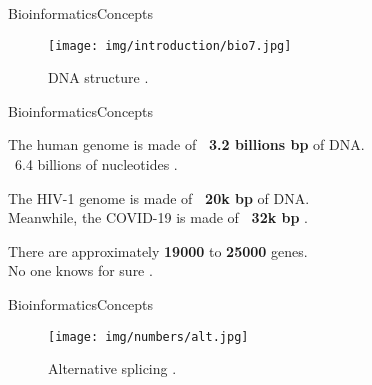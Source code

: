 \documentclass[10pt]{beamer}
\newcommand{\1}{
        	\setbeamertemplate{background}{
        		\texttt{[image: img/1]}
        		\tikz[overlay] \fill[fill opacity=0.75,fill=white] (0,0) rectangle (-\paperwidth,\paperheight);
        	}
}
\begin{document}
\begin{frame}{Bioinformatics}{Concepts}
	\begin{figure}[]
		\centering
		\texttt{[image: img/introduction/bio7.jpg]}
		\label{img:mot2}
		\caption{DNA structure \cite{dnastructure2020}.}
	\end{figure}
\end{frame}



\begin{frame}{Bioinformatics}{Concepts}
	
	\begin{block}{}
		\centering
		The human genome is made of \textbf{\string ~3.2 billions bp} of DNA. \\
		\string ~6.4 billions of nucleotides \cite{archibald2018genomics}.
	\end{block}

	\pause
	\begin{block}{}
		\centering
		The HIV-1 genome is made of \textbf{\string ~20k bp} of DNA. \\
		Meanwhile, the COVID-19 is made of \textbf{\string ~32k bp} \cite{randhawa2020machine}.
	\end{block}

	\pause
	\begin{block}{}
		\centering
		There are approximately \textbf{19000} to \textbf{25000} genes. \\
		No one knows for sure \cite{archibald2018genomics}.
	\end{block}
	
\end{frame}

\begin{frame}{Bioinformatics}{Concepts}
	\begin{figure}[]
		\centering
		\texttt{[image: img/numbers/alt.jpg]}
		\label{img:mot2}
		\caption{Alternative splicing \cite{genbio2020}.}
	\end{figure}
\end{frame}
\end{document}
